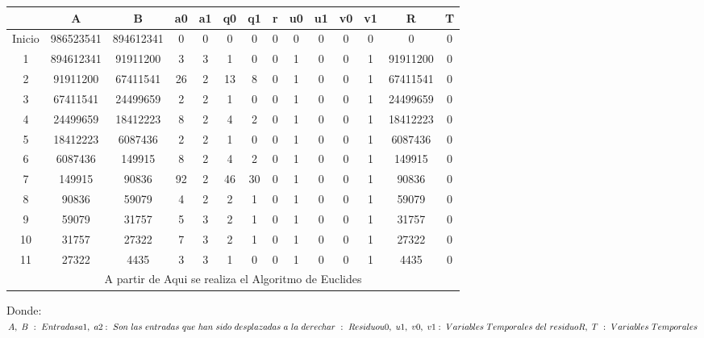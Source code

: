 \documentclass[11pt, conference]{IEEEtran}
\begin{document}
\begin{center}
	\begin{tabular}{|c|c|c|c|c|c|c|c|c|c|c|c|c|c|}
		\hline
		& \textbf{A} & \textbf{B} & \textbf{a0} & \textbf{a1} & \textbf{q0}& \textbf{q1} & \textbf{r} & \textbf{u0} & \textbf{u1} & \textbf{v0} & \textbf{v1} & \textbf{R} & \textbf{T}\\	\hline
		Inicio &  986523541 & 894612341 & 0 & 0 & 0 & 0 & 0& 0& 0& 0& 0& 0& 0\\ \hline
		1 & 894612341 & 91911200 & 3 & 3  &  1 & 0 & 0 & 1 & 0 & 0 & 1 & 91911200 & 0 \\ \hline
		2 & 91911200 & 67411541 & 26 & 2  &  13 & 8 & 0 & 1 & 0 & 0 & 1 & 67411541 & 0 \\ \hline
		3 & 67411541 & 24499659 & 2 & 2  &  1 & 0 & 0 & 1 & 0 & 0 & 1 & 24499659 & 0 \\ \hline
		4 & 24499659 & 18412223 & 8 & 2  &  4 & 2 & 0 & 1 & 0 & 0 & 1 & 18412223 & 0 \\ \hline
		5 & 18412223 & 6087436 & 2 & 2  &  1 & 0 & 0 & 1 & 0 & 0 & 1 & 6087436 & 0 \\ \hline
		6 & 6087436 & 149915 & 8 & 2  &  4 & 2 & 0 & 1 & 0 & 0 & 1 & 149915 & 0 \\ \hline
		7 & 149915 & 90836 & 92 & 2  &  46 & 30 & 0 & 1 & 0 & 0 & 1 & 90836 & 0 \\ \hline
		8 & 90836 & 59079 & 4 & 2  &  2 & 1 & 0 & 1 & 0 & 0 & 1 & 59079 & 0 \\ \hline
		9 & 59079 & 31757 & 5 & 3  &  2 & 1 & 0 & 1 & 0 & 0 & 1 & 31757 & 0 \\ \hline
		10 & 31757 & 27322 & 7 & 3  &  2 & 1 & 0 & 1 & 0 & 0 & 1 & 27322 & 0 \\ \hline
		11 & 27322 & 4435 & 3 & 3  &  1 & 0 & 0 & 1 & 0 & 0 & 1 & 4435 & 0 \\ \hline
		\multicolumn{14}{|c|}{A partir de Aqui se realiza el Algoritmo de Euclides} \\
		\hline		
	\end{tabular}
\end{center}
Donde:\\
$
A,\ B\ :\ Entradas \\
a1,\ a2:\ Son\ las\ entradas\ que\ han\ sido\ desplazadas\ a\ la\ derecha \\
r\ :\ Residuo\\
u0,\ u1,\ v0,\ v1:\  Variables\ Temporales\ del\ residuo\\
R,\ T \ :\ Variables\ Temporales\\
$
\bigskip
\bigskip
\bigskip
\bigskip
\bigskip
\bigskip
\pagebreak
\end{document}
